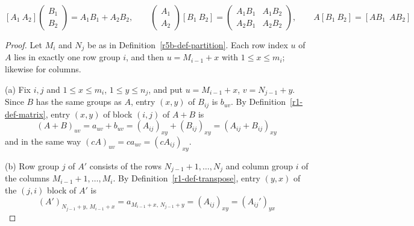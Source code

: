 \documentclass[12pt]{article}
\theoremstyle{definition}
\begin{document}
\[
[A_1\ A_2]\begin{pmatrix}B_1\\B_2\end{pmatrix}=A_1B_1+A_2B_2,\qquad
\begin{pmatrix}A_1\\A_2\end{pmatrix}[B_1\ B_2]=\begin{pmatrix}A_1B_1&A_1B_2\\A_2B_1&A_2B_2\end{pmatrix},\qquad
A[B_1\ B_2]=[AB_1\ \ AB_2]
\]
\begin{proof}
Let \(M_i\) and \(N_j\) be as in Definition~\ref{r5b-def-partition}. Each row index \(u\) of \(A\) lies in exactly one row group \(i\), and then
\(u=M_{i-1}+x\) with \(1\leqslant x\leqslant m_i\); likewise for columns.

(a) Fix \(i,j\) and \(1\leqslant x\leqslant m_i\), \(1\leqslant y\leqslant n_j\), and put
\(u=M_{i-1}+x\), \(v=N_{j-1}+y\). Since \(B\) has the same groups as \(A\), entry \((x,y)\) of
\(B_{ij}\) is \(b_{uv}\). By Definition~\ref{r1-def-matrix}, entry \((x,y)\) of block \((i,j)\) of
\(A+B\) is
\[
(A+B)_{uv}=a_{uv}+b_{uv}=(A_{ij})_{xy}+(B_{ij})_{xy}=(A_{ij}+B_{ij})_{xy}
\]
and in the same way \((cA)_{uv}=ca_{uv}=(cA_{ij})_{xy}\).

(b) Row group \(j\) of \(A'\) consists of the rows \(N_{j-1}+1,\dots,N_j\) and column group \(i\) of
the columns \(M_{i-1}+1,\dots,M_i\). By Definition~\ref{r1-def-transpose}, entry \((y,x)\) of the
\((j,i)\) block of \(A'\) is
\[
(A')_{N_{j-1}+y,\,M_{i-1}+x}=a_{M_{i-1}+x,\,N_{j-1}+y}=(A_{ij})_{xy}=(A_{ij}')_{yx}
\]


\end{proof}
\end{document}
